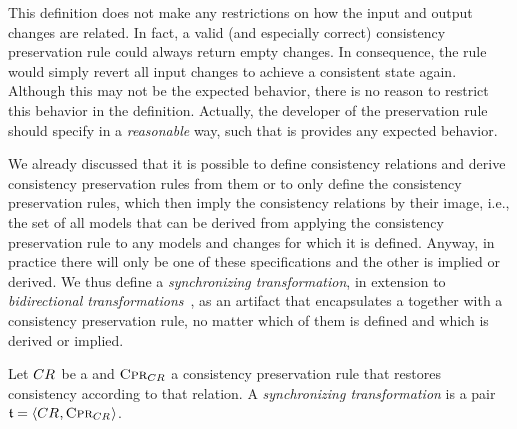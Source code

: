 This definition does not make any restrictions on how the input and output changes are related.
In fact, a valid (and especially correct) consistency preservation rule could always return empty changes.
In consequence, the rule would simply revert all input changes to achieve a consistent state again.
Although this may not be the expected behavior, there is no reason to restrict this behavior in the definition.
Actually, the developer of the preservation rule should specify in a \emph{reasonable} way, such that is provides any expected behavior.


We already discussed that it is possible to define consistency relations and derive consistency preservation rules from them or to only define the consistency preservation rules, which then imply the consistency relations by their image, i.e., the set of all models that can be derived from applying the consistency preservation rule to any models and changes for which it is defined.
Anyway, in practice there will only be one of these specifications and the other is implied or derived.
We thus define a \emph{synchronizing transformation}, in extension to \emph{bidirectional transformations}~\cite{stevens2010sosym}, as an artifact that encapsulates a \modellevelconsistencyrelation together with a consistency preservation rule, no matter which of them is defined and which is derived or implied.

\begin{definition}
    \label{def:synchronizingtransformation}
    Let $CR_{}$ be a \modellevelconsistencyrelation and $\textsc{Cpr}_{CR_{}}$ a consistency preservation rule that restores consistency according to that relation.
    A \emph{synchronizing transformation} is a pair $\mathfrak{t} = \langle CR_{}, \textsc{Cpr}_{CR_{}} \rangle$.
\end{definition}

